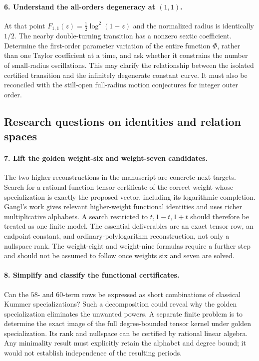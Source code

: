 \paragraph{6. Understand the all-orders degeneracy at $(1,1)$.}
At that point $F_{1,1}(z)=\tfrac12\log^2(1-z)$ and the normalized
radius is identically $1/2$. The nearby double-turning transition has
a nonzero sextic coefficient. Determine the first-order parameter
variation of the entire function $\Phi$, rather than one Taylor
coefficient at a time, and ask whether it constrains the number of
small-radius oscillations. This may clarify the relationship between
the isolated certified transition and the infinitely degenerate
constant curve. It must also be reconciled with the still-open
full-radius motion conjectures for integer outer order.

\subsection{Research questions on identities and relation spaces}

\paragraph{7. Lift the golden weight-six and weight-seven candidates.}
The two higher reconstructions in the manuscript are concrete next
targets. Search for a rational-function tensor certificate of the
correct weight whose specialization is exactly the proposed vector,
including its logarithmic completion. Gangl's work
\cite{Gangl} gives relevant higher-weight functional identities and
uses richer multiplicative alphabets. A search restricted to
$t,1-t,1+t$ should therefore be treated as one finite model. The
essential deliverables are an exact tensor row, an endpoint constant,
and ordinary-polylogarithm reconstruction, not only a nullspace rank.
The weight-eight and weight-nine formulas require a further step and
should not be assumed to follow once weights six and seven are solved.

\paragraph{8. Simplify and classify the functional certificates.}
Can the $58$- and $60$-term rows be expressed as short combinations of
classical Kummer specializations? Such a decomposition could reveal
why the golden specialization eliminates the unwanted powers. A
separate finite problem is to determine the exact image of the full
degree-bounded tensor kernel under golden specialization. Its rank
and nullspace can be certified by rational linear algebra. Any
minimality result must explicitly retain the alphabet and degree
bound; it would not establish independence of the resulting periods.

